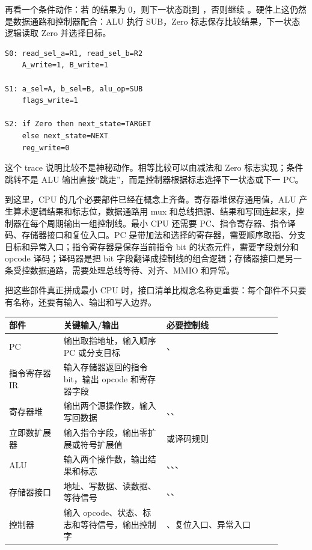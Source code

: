 再看一个条件动作：若  的结果为 0，则下一状态跳到 ，否则继续 。硬件上这仍然是数据通路和控制器配合：ALU 执行 SUB，Zero 标志保存比较结果，下一状态逻辑读取 Zero 并选择目标。

\begin{lstlisting}
S0: read_sel_a=R1, read_sel_b=R2
    A_write=1, B_write=1

S1: a_sel=A, b_sel=B, alu_op=SUB
    flags_write=1

S2: if Zero then next_state=TARGET
    else next_state=NEXT
    reg_write=0
\end{lstlisting}

这个 trace 说明比较不是神秘动作。相等比较可以由减法和 Zero 标志实现；条件跳转不是 ALU 输出直接“跳走”，而是控制器根据标志选择下一状态或下一 PC。


到这里，CPU 的几个必要部件已经在概念上齐备。寄存器堆保存通用值，ALU 产生算术逻辑结果和标志位，数据通路用 mux 和总线把源、结果和写回连起来，控制器在每个周期输出一组控制线。最小 CPU 还需要 PC、指令寄存器、指令译码、存储器接口和复位入口。PC 是带加法和选择的寄存器，需要顺序取指、分支目标和异常入口；指令寄存器是保存当前指令 bit 的状态元件，需要字段划分和 opcode 译码；译码器是把 bit 字段翻译成控制线的组合逻辑；存储器接口是另一条受控数据通路，需要处理总线等待、对齐、MMIO 和异常。

把这些部件真正拼成最小 CPU 时，接口清单比概念名称更重要：每个部件不只要有名称，还要有输入、输出和写入边界。

\begin{longtable}{L{0.18\linewidth}L{0.34\linewidth}L{0.38\linewidth}}
\toprule
部件 & 关键输入/输出 & 必要控制线 \\
\midrule
PC & 输出取指地址，输入顺序 PC 或分支目标 & 、 \\
指令寄存器 IR & 输入存储器返回的指令 bit，输出 opcode 和寄存器字段 &  \\
寄存器堆 & 输出两个源操作数，输入写回数据 & 、、 \\
立即数扩展器 & 输入指令字段，输出零扩展或符号扩展值 &  或译码规则 \\
ALU & 输入两个操作数，输出结果和标志 & 、、、 \\
存储器接口 & 地址、写数据、读数据、等待信号 & 、、 \\
控制器 & 输入 opcode、状态、标志和等待信号，输出控制字 & 、复位入口、异常入口 \\
\bottomrule
\end{longtable}

